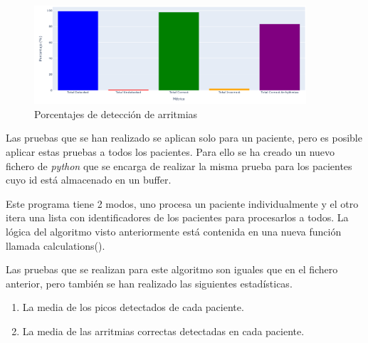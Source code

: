 \begin{figure}[h!]
	\centering
    \includegraphics[width=0.9\textwidth]{./Images/img_algoritmo/estadisticas_arritmias_2.png}
    \caption{Porcentajes de detección de arritmias}
    \label{fig:estadisticas_algoritmos_2}
\end{figure} 


Las pruebas que se han realizado se aplican solo para un paciente, pero es posible aplicar estas pruebas a todos los pacientes.
Para ello se ha creado un nuevo fichero de \textit{python} que se encarga de realizar la misma prueba para los pacientes cuyo id está
almacenado en un buffer.

Este programa tiene 2 modos, uno procesa un paciente individualmente y el otro itera una lista con identificadores de los pacientes para procesarlos a todos. La
lógica del algoritmo visto anteriormente está contenida en una nueva función llamada calculations().


Las pruebas que se realizan para este algoritmo son iguales que en el fichero anterior, pero también
se han realizado las siguientes estadísticas.

\begin{enumerate}
	\item La media de los picos detectados de cada paciente.
	\item La media de las arritmias correctas detectadas en cada paciente.
\end{enumerate} 